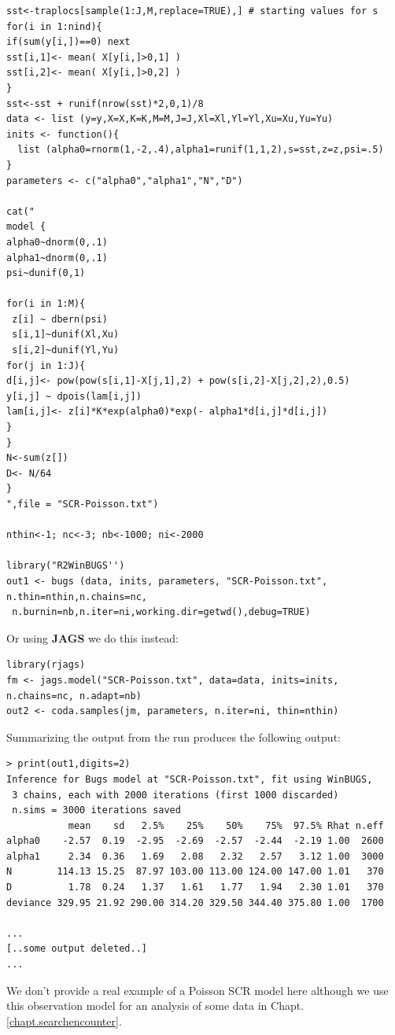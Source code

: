 {\small 
\begin{verbatim}
sst<-traplocs[sample(1:J,M,replace=TRUE),] # starting values for s
for(i in 1:nind){
if(sum(y[i,])==0) next
sst[i,1]<- mean( X[y[i,]>0,1] )
sst[i,2]<- mean( X[y[i,]>0,2] )
}
sst<-sst + runif(nrow(sst)*2,0,1)/8
data <- list (y=y,X=X,K=K,M=M,J=J,Xl=Xl,Yl=Yl,Xu=Xu,Yu=Yu)
inits <- function(){
  list (alpha0=rnorm(1,-2,.4),alpha1=runif(1,1,2),s=sst,z=z,psi=.5)
}
parameters <- c("alpha0","alpha1","N","D")

cat("
model {
alpha0~dnorm(0,.1)
alpha1~dnorm(0,.1)
psi~dunif(0,1)

for(i in 1:M){
 z[i] ~ dbern(psi)
 s[i,1]~dunif(Xl,Xu)
 s[i,2]~dunif(Yl,Yu) 
for(j in 1:J){
d[i,j]<- pow(pow(s[i,1]-X[j,1],2) + pow(s[i,2]-X[j,2],2),0.5)
y[i,j] ~ dpois(lam[i,j])
lam[i,j]<- z[i]*K*exp(alpha0)*exp(- alpha1*d[i,j]*d[i,j])
}
}
N<-sum(z[])
D<- N/64
}
",file = "SCR-Poisson.txt")

nthin<-1; nc<-3; nb<-1000; ni<-2000

library("R2WinBUGS'')
out1 <- bugs (data, inits, parameters, "SCR-Poisson.txt", n.thin=nthin,n.chains=nc,
 n.burnin=nb,n.iter=ni,working.dir=getwd(),debug=TRUE)
\end{verbatim}
}
Or using {\bf JAGS} we do this instead:
{\small
\begin{verbatim}
library(rjags)
fm <- jags.model("SCR-Poisson.txt", data=data, inits=inits, n.chains=nc, n.adapt=nb)
out2 <- coda.samples(jm, parameters, n.iter=ni, thin=nthin)
\end{verbatim}
}
Summarizing the output from the \winbugs run produces the following output:
{\small
\begin{verbatim}
> print(out1,digits=2)
Inference for Bugs model at "SCR-Poisson.txt", fit using WinBUGS,
 3 chains, each with 2000 iterations (first 1000 discarded)
 n.sims = 3000 iterations saved
           mean    sd   2.5%    25%    50%    75%  97.5% Rhat n.eff
alpha0    -2.57  0.19  -2.95  -2.69  -2.57  -2.44  -2.19 1.00  2600
alpha1     2.34  0.36   1.69   2.08   2.32   2.57   3.12 1.00  3000
N        114.13 15.25  87.97 103.00 113.00 124.00 147.00 1.01   370
D          1.78  0.24   1.37   1.61   1.77   1.94   2.30 1.01   370
deviance 329.95 21.92 290.00 314.20 329.50 344.40 375.80 1.00  1700

...
[..some output deleted..]
...
\end{verbatim}
}

We don't provide a real example of a Poisson SCR model here although
we use this observation model for an analysis of some data in Chapt.
\ref{chapt.searchencounter}.

